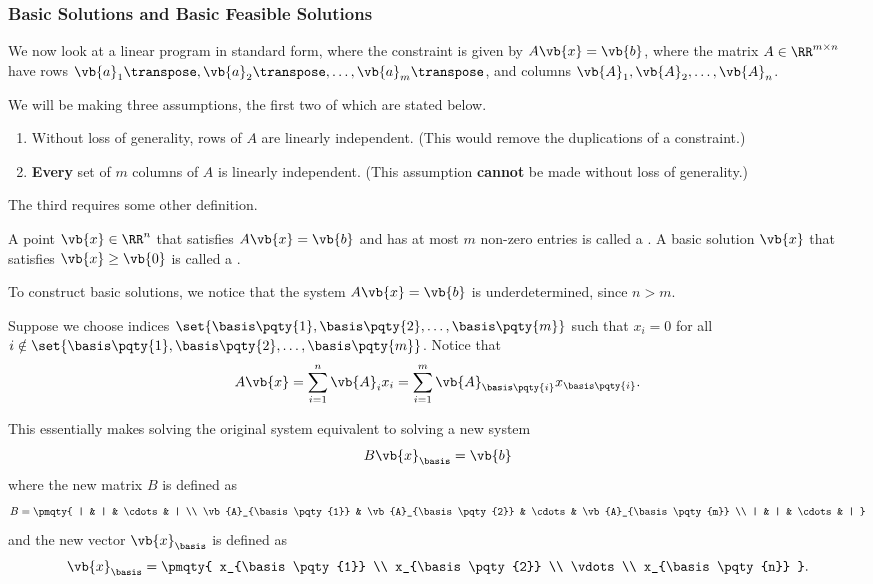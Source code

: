 \subsubsection{Basic Solutions and Basic Feasible Solutions}

We now look at a linear program in standard form, where the constraint is given by \(A \vb{x} = \vb{b}\), where the matrix \(A \in \RR^{m \times n}\) have rows \(\vb{a}_1\transpose, \vb{a}_2\transpose, \ldots, \vb{a}_m\transpose\), and columns \(\vb{A}_1, \vb{A}_2, \ldots, \vb{A}_n\).

We will be making three assumptions, the first two of which are stated below.

\begin{enumerate}[label=(\Alph*)]
    \item Without loss of generality, rows of \(A\) are linearly independent. (This would remove the duplications of a constraint.)
    \item \textbf{Every} set of \(m\) columns of \(A\) is linearly independent. (This assumption \textbf{cannot} be made without loss of generality.)
\end{enumerate}

The third requires some other definition.

\begin{definition}
    A point \(\vb{x} \in \RR^n\) that satisfies \(A\vb{x} = \vb{b}\) and has at most \(m\) non-zero entries is called a . A basic solution \(\vb{x}\) that satisfies \(\vb{x} \geq \vb{0}\) is called a .
\end{definition}

To construct basic solutions, we notice that the system \(A\vb{x} = \vb{b}\) is underdetermined, since \(n > m\).

Suppose we choose indices \(\set{\basis\pqty{1}, \basis\pqty{2}, \ldots, \basis\pqty{m}}\) such that \(x_i = 0\) for all \(i \notin \set{\basis\pqty{1}, \basis\pqty{2}, \ldots, \basis\pqty{m}}\). Notice that
\[
    A\vb{x} = \sum_{i = 1}^{n} \vb{A}_i x_i = \sum_{i = 1}^{m} \vb{A}_{\basis\pqty{i}} x_{\basis\pqty{i}}.
\]

This essentially makes solving the original system equivalent to solving a new system
\[
    B \vb{x}_{\basis} = \vb{b}
\]
where the new matrix \(B\) is defined as
\[
    B = \pmqty{
        | & | & \cdots & | \\
        \vb{A}_{\basis\pqty{1}} & \vb{A}_{\basis\pqty{2}} & \cdots & \vb{A}_{\basis\pqty{m}} \\
        | & | & \cdots & |
    }
\]
and the new vector \(\vb{x}_{\basis}\) is defined as
\[
    \vb{x}_{\basis} = \pmqty{
        x_{\basis\pqty{1}} \\
        x_{\basis\pqty{2}} \\
        \vdots \\
        x_{\basis\pqty{n}}
    }.
\]

